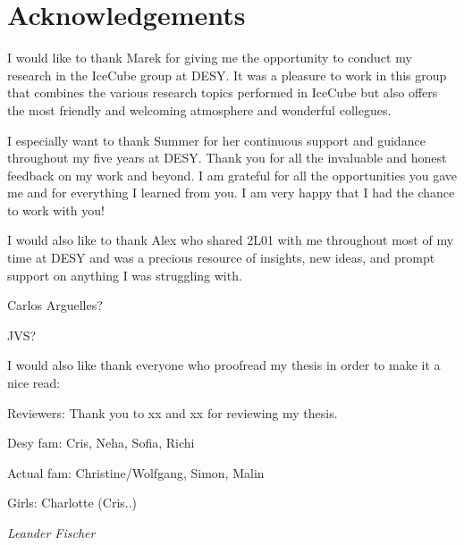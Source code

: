 \chapter*{Acknowledgements}
I would like to thank Marek for giving me the opportunity to conduct my research in the IceCube group at DESY. It was a pleasure to work in this group that combines the various research topics performed in IceCube but also offers the most friendly and welcoming atmosphere and wonderful collegues.

I especially want to thank Summer for her continuous support and guidance throughout my five years at DESY. Thank you for all the invaluable and honest feedback on my work and beyond. I am grateful for all the opportunities you gave me and for everything I learned from you. I am very happy that I had the chance to work with you!

I would also like to thank Alex who shared 2L01 with me throughout most of my time at DESY and was a precious resource of insights, new ideas, and prompt support on anything I was struggling with.

Carlos Arguelles?

JVS?

I would also like thank everyone who proofread my thesis in order to make it a nice read: 


Reviewers:
Thank you to xx and xx for reviewing my thesis.


Desy fam:
Cris, Neha, Sofia, Richi


Actual fam:
Christine/Wolfgang, Simon, Malin

Girls:
Charlotte (Cris..)


\begin{flushright}
	\textit{Leander Fischer}
\end{flushright}